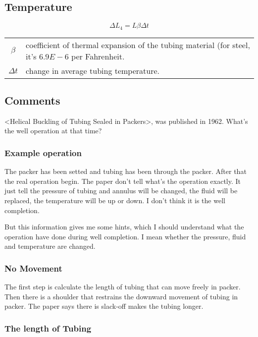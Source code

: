 \documentclass{article}
\begin{document}
\subsection{Temperature}
\begin{equation}
\Delta L_4 = L\beta\Delta t
\end{equation}
\begin{center}
\begin{tabular}{c l}
$\beta$ & coefficient of thermal expansion of the tubing material (for steel,
  it's $6.9E-6$ per Fahrenheit. \\
$\Delta t$ & change in average tubing temperature. \\
\end{tabular}
\end{center}

\subsection{Comments}
<Helical Buckling of Tubing Sealed in Packers>, was published in 1962. What's
the well operation at that time?

\subsubsection{Example operation}
The packer has been setted and tubing has been through the packer. After that
the real operation begin. The paper don't tell what's the operation
exactly. It just tell the pressure of tubing and annulus will be changed, the
fluid will be replaced, the temperature will be up or down. I don't think it
is the well completion.

But this information gives me some hints, which I should understand what the
operation have done during well completion. I mean whether the pressure, fluid
and temperature are changed.

\subsubsection{No Movement}
The first step is calculate the length of tubing that can move freely in
packer. Then there is a shoulder that restrains the downward movement of
tubing in packer. The paper says there is slack-off makes the tubing longer.

\subsubsection{The length of Tubing}
\end{document}
